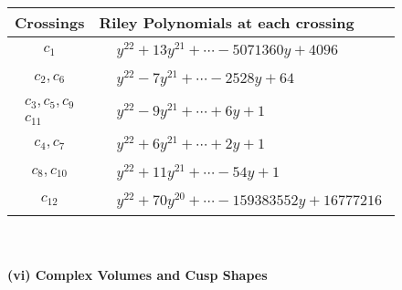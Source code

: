 \documentclass[1p]{elsarticle_modified}
\theoremstyle{definition}
\begin{document}
\begin{tabular}{m{50pt}|m{274pt}}
Crossings & \hspace{64pt}Riley Polynomials at each crossing \\
\hline $$\begin{aligned}c_{1}\end{aligned}$$&$\begin{aligned}
&y^{22}+13 y^{21}+\cdots-5071360 y+4096
\end{aligned}$\\
\hline $$\begin{aligned}c_{2},c_{6}\end{aligned}$$&$\begin{aligned}
&y^{22}-7 y^{21}+\cdots-2528 y+64
\end{aligned}$\\
\hline $$\begin{aligned}c_{3},c_{5},c_{9}\\c_{11}\end{aligned}$$&$\begin{aligned}
&y^{22}-9 y^{21}+\cdots+6 y+1
\end{aligned}$\\
\hline $$\begin{aligned}c_{4},c_{7}\end{aligned}$$&$\begin{aligned}
&y^{22}+6 y^{21}+\cdots+2 y+1
\end{aligned}$\\
\hline $$\begin{aligned}c_{8},c_{10}\end{aligned}$$&$\begin{aligned}
&y^{22}+11 y^{21}+\cdots-54 y+1
\end{aligned}$\\
\hline $$\begin{aligned}c_{12}\end{aligned}$$&$\begin{aligned}
&y^{22}+70 y^{20}+\cdots-159383552 y+16777216
\end{aligned}$\\
\hline
\end{tabular}\\~\\
\newpage\flushleft \textbf{(vi) Complex Volumes and Cusp Shapes}
\end{document}
